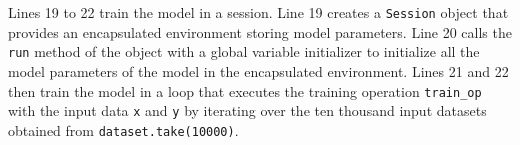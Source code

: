 Lines 19 to 22 train the model in a session.
Line 19 creates a {\tt Session} object that provides an encapsulated
environment storing model parameters.
Line 20 calls the {\tt run} method of the object with a global variable
initializer to initialize all the model parameters of the model in the
encapsulated environment.
Lines 21 and 22 then train the model in a loop that executes the training
operation {\tt train\_op} with the input data {\tt x} and {\tt y} by iterating
over the ten thousand input datasets obtained from {\tt dataset.take(10000)}.

